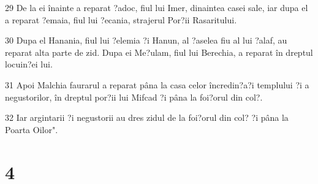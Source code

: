 \par 29 De la ei înainte a reparat ?adoc, fiul lui Imer, dinaintea casei sale, iar dupa el a reparat ?emaia, fiul lui ?ecania, strajerul Por?ii Rasaritului.
\par 30 Dupa el Hanania, fiul lui ?elemia ?i Hanun, al ?aselea fiu al lui ?alaf, au reparat alta parte de zid. Dupa ei Me?ulam, fiul lui Berechia, a reparat în dreptul locuin?ei lui.
\par 31 Apoi Malchia faurarul a reparat pâna la casa celor încredin?a?i templului ?i a negustorilor, în dreptul por?ii lui Mifcad ?i pâna la foi?orul din col?.
\par 32 Iar argintarii ?i negustorii au dres zidul de la foi?orul din col? ?i pâna la Poarta Oilor".

\chapter{4}

